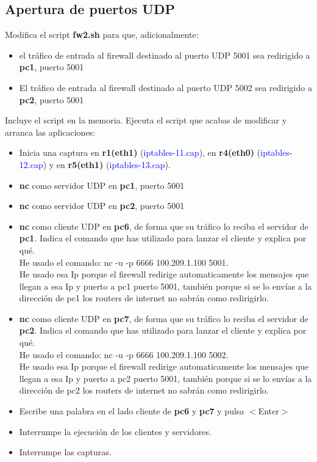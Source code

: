 \documentclass[12pt, a4paper]{report}
\begin{document}
\subsection{Apertura de puertos UDP}
Modifica el script \textbf{fw2.sh} para que, adicionalmente:
\begin{itemize}
	\item el tráfico de entrada al firewall destinado al puerto UDP 5001 sea redirigido a \textbf{pc1}, puerto 5001
	\item El tráfico de entrada al firewall destinado al puerto UDP 5002 sea redirigido a \textbf{pc2}, puerto 5001
\end{itemize}
Incluye el script en la memoria. Ejecuta el script que acabas de modificar y arranca las aplicaciones:
\begin{itemize}
	\item Inicia una captura en \textbf{r1(eth1)} (\textcolor{blue}{iptables-11.cap}), en \textbf{r4(eth0)} (\textcolor{blue}{iptables-12.cap}) y en \textbf{r5(eth1)} (\textcolor{blue}{iptables-13.cap}).
	\item \textbf{nc} como servidor UDP en \textbf{pc1}, puerto 5001
	\item \textbf{nc} como servidor UDP en \textbf{pc2}, puerto 5001
	\item \textbf{nc} como cliente UDP en \textbf{pc6}, de forma que su tráfico lo reciba el servidor de \textbf{pc1}. Indica el
	comando que has utilizado para lanzar el cliente y explica por qué.\\
	
	He usado el comando: nc -u -p 6666 100.209.1.100 5001.\\
	He usado esa Ip porque el firewall redirige automaticamente los mensajes que llegan a esa Ip y puerto a pc1 puerto 5001, también porque si se lo envías a la dirección de pc1 los routers de internet no sabrán como redirigirlo.
	\item \textbf{nc} como cliente UDP en \textbf{pc7}, de forma que su tráfico lo reciba el servidor de \textbf{pc2}. Indica el
	comando que has utilizado para lanzar el cliente y explica por qué.\\
	
	He usado el comando: nc -u -p 6666 100.209.1.100 5002.\\
	He usado esa Ip porque el firewall redirige automaticamente los mensajes que llegan a esa Ip y puerto a pc2 puerto 5001, también porque si se lo envías a la dirección de pc2 los routers de internet no sabrán como redirigirlo.
	\item Escribe una palabra en el lado cliente de \textbf{pc6} y \textbf{pc7} y pulsa $<$Enter$>$
	\item Interrumpe la ejecución de los clientes y servidores.
	\item Interrumpe las capturas.
\end{itemize}
\end{document}
